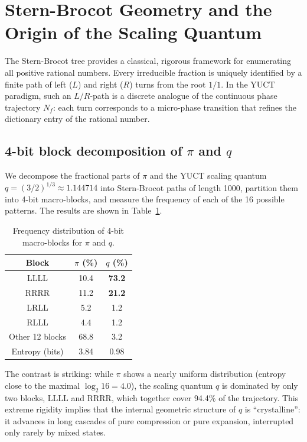 \documentclass[12pt,a4paper]{article}
\begin{document}
	\section{Stern-Brocot Geometry and the Origin of the Scaling Quantum}
	\label{sec:stern-brocot}
	
	The Stern-Brocot tree provides a classical, rigorous framework for enumerating all positive rational numbers.  Every irreducible fraction is uniquely identified by a finite path of left (\(L\)) and right (\(R\)) turns from the root \(1/1\).  In the YUCT paradigm, such an \(L/R\)-path is a discrete analogue of the continuous phase trajectory \(N_f\): each turn corresponds to a micro-phase transition that refines the dictionary entry of the rational number.
	
	\subsection{4-bit block decomposition of \(\pi\) and \(q\)}
	
	We decompose the fractional parts of \(\pi\) and the YUCT scaling quantum \(q = (3/2)^{1/3} \approx 1.144714\) into Stern-Brocot paths of length 1000, partition them into 4-bit macro-blocks, and measure the frequency of each of the 16 possible patterns.  The results are shown in Table~\ref{tab:block-spectra}.
	
	\begin{table}[htbp]
		\centering
		\caption{Frequency distribution of 4-bit macro-blocks for \(\pi\) and \(q\).}
		\label{tab:block-spectra}
		\begin{tabular}{c c c}
			\toprule
			Block & \(\pi\) (\%) & \(q\) (\%) \\
			\midrule
			LLLL & 10.4 & \textbf{73.2} \\
			RRRR & 11.2 & \textbf{21.2} \\
			LRLL & 5.2 & 1.2 \\
			RLLL & 4.4 & 1.2 \\
			Other 12 blocks & 68.8 & 3.2 \\
			\midrule
			Entropy (bits) & 3.84 & 0.98 \\
			\bottomrule
		\end{tabular}
	\end{table}
	
	The contrast is striking: while \(\pi\) shows a nearly uniform distribution (entropy close to the maximal \(\log_2 16 = 4.0\)), the scaling quantum \(q\) is dominated by only two blocks, LLLL and RRRR, which together cover 94.4\% of the trajectory.  This extreme rigidity implies that the internal geometric structure of \(q\) is ``crystalline'': it advances in long cascades of pure compression or pure expansion, interrupted only rarely by mixed states.
	
\end{document}

